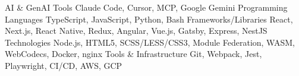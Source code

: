 \begin{cvskills}

  \cvskill
    {AI \& GenAI Tools} %
    {Claude Code, Cursor, MCP, Google Gemini}
  \cvskill
    {Programming Languages} %
    {TypeScript, JavaScript, Python, Bash}
  \cvskill
    {Frameworks/Libraries} %
    {React, Next.js, React Native, Redux, Angular, Vue.js, Gatsby, Express, NestJS}
  \cvskill
    {Technologies} %
    {Node.js, HTML5, SCSS/LESS/CSS3, Module Federation, WASM, WebCodecs, Docker, nginx}
  \cvskill
    {Tools \& Infrastructure} %
    {Git, Webpack, Jest, Playwright, CI/CD, AWS, GCP}
\end{cvskills}
